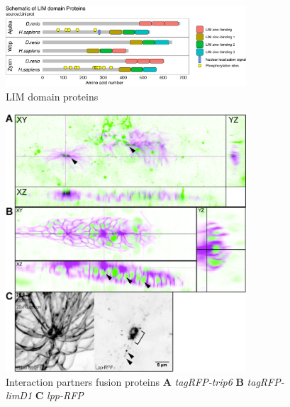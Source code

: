\documentclass[11pt,singlespacinge,twoside]{reedthesis} %
\begin{document}
\begin{figure}

{\centering \includegraphics[width=0.8\textwidth]{figures/supp/lim} 

}

\caption[LIM domain proteins]{LIM domain proteins}\label{fig:supplim}
\end{figure}

\begin{figure}

{\centering \includegraphics[width=0.8\textwidth]{figures/supp/partners/partners} 

}

\caption[Interaction partners fusion proteins]{Interaction partners fusion proteins \textbf{A} \emph{tagRFP-trip6} \textbf{B} \emph{tagRFP-limD1} \textbf{C} \emph{lpp-RFP}}\label{fig:supplpp}
\end{figure}
\end{document}
